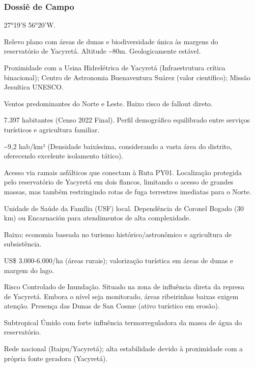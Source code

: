 \subsubsection{Dossiê de Campo}
\begin{description}[style=nextline,leftmargin=0.5cm,font=\bfseries]
\item[Coordenadas]  27°19'S 56°20'W.
\item[Topografia]  Relevo plano com áreas de dunas e biodiversidade única às margens do reservatório de Yacyretá. Altitude \textasciitilde 80m. Geologicamente estável.
\item[Alvos Estratégicos]  Proximidade com a Usina Hidrelétrica de Yacyretá (Infraestrutura crítica binacional); Centro de Astronomia Buenaventura Suárez (valor científico); Missão Jesuítica UNESCO.
\item[Fallout]  Ventos predominantes do Norte e Leste. Baixo risco de fallout direto.
\item[População]  7.397 habitantes (Censo 2022 Final). Perfil demográfico equilibrado entre serviços turísticos e agricultura familiar.
\item[Densidade]  \textasciitilde 9,2 hab/\allowbreak km² (Densidade baixíssima, considerando a vasta área do distrito, oferecendo excelente isolamento tático).
\item[Vias de Acesso]  Acesso via ramais asfálticos que conectam à Ruta PY01. Localização protegida pelo reservatório de Yacyretá em dois flancos, limitando o acesso de grandes massas, mas também restringindo rotas de fuga terrestres imediatas para o Norte.
\item[Serviços]  Unidade de Saúde da Família (USF) local. Dependência de Coronel Bogado (30 km) ou Encarnación para atendimentos de alta complexidade.
\item[Custo de Vida]  Baixo; economia baseada no turismo histórico/\allowbreak astronômico e agricultura de subsistência.
\item[Preço da Terra]  US\$ 3.000-6.000/\allowbreak ha (áreas rurais); valorização turística em áreas de dunas e margem do lago.
\item[Hidrologia]  Risco Controlado de Inundação. Situado na zona de influência direta da represa de Yacyretá. Embora o nível seja monitorado, áreas ribeirinhas baixas exigem atenção. Presença das Dunas de San Cosme (ativo turístico em erosão).
\item[Clima]  Subtropical Úmido com forte influência termorreguladora da massa de água do reservatório.
\item[Energia]  Rede nacional (Itaipu/\allowbreak Yacyretá); alta estabilidade devido à proximidade com a própria fonte geradora (Yacyretá).

\end{description}
